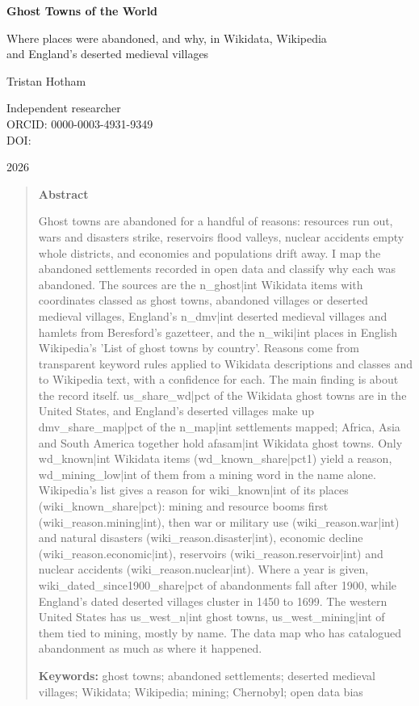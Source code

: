 \documentclass[11pt,a4paper]{article}
\begin{document}
\begin{center}
{\Large\bfseries Ghost Towns of the World\par}
\vspace{0.4em}
{\large Where places were abandoned, and why, in Wikidata, Wikipedia\\and England's deserted medieval villages\par}
\vspace{1.2em}
{\large Tristan Hotham\par}
\vspace{0.3em}
{\small Independent researcher\\
ORCID: 0000-0003-4931-9349\\
DOI: \par}
\vspace{0.8em}
2026
\end{center}

\begin{quote}
\small
\begin{center}\textbf{Abstract}\end{center}
Ghost towns are abandoned for a handful of reasons: resources run out, wars and disasters strike, reservoirs flood valleys, nuclear accidents empty whole districts, and economies and populations drift away. I map the abandoned settlements recorded in open data and classify why each was abandoned. The sources are the {{n_ghost|int}} Wikidata items with coordinates classed as ghost towns, abandoned villages or deserted medieval villages, England's {{n_dmv|int}} deserted medieval villages and hamlets from Beresford's gazetteer, and the {{n_wiki|int}} places in English Wikipedia's 'List of ghost towns by country'. Reasons come from transparent keyword rules applied to Wikidata descriptions and classes and to Wikipedia text, with a confidence for each. The main finding is about the record itself. {{us_share_wd|pct}} of the Wikidata ghost towns are in the United States, and England's deserted villages make up {{dmv_share_map|pct}} of the {{n_map|int}} settlements mapped; Africa, Asia and South America together hold {{afasam|int}} Wikidata ghost towns. Only {{wd_known|int}} Wikidata items ({{wd_known_share|pct1}}) yield a reason, {{wd_mining_low|int}} of them from a mining word in the name alone. Wikipedia's list gives a reason for {{wiki_known|int}} of its places ({{wiki_known_share|pct}}): mining and resource booms first ({{wiki_reason.mining|int}}), then war or military use ({{wiki_reason.war|int}}) and natural disasters ({{wiki_reason.disaster|int}}), economic decline ({{wiki_reason.economic|int}}), reservoirs ({{wiki_reason.reservoir|int}}) and nuclear accidents ({{wiki_reason.nuclear|int}}). Where a year is given, {{wiki_dated_since1900_share|pct}} of abandonments fall after 1900, while England's dated deserted villages cluster in 1450 to 1699. The western United States has {{us_west_n|int}} ghost towns, {{us_west_mining|int}} of them tied to mining, mostly by name. The data map who has catalogued abandonment as much as where it happened.

\textbf{Keywords:} ghost towns; abandoned settlements; deserted medieval villages; Wikidata; Wikipedia; mining; Chernobyl; open data bias
\end{quote}
\end{document}
